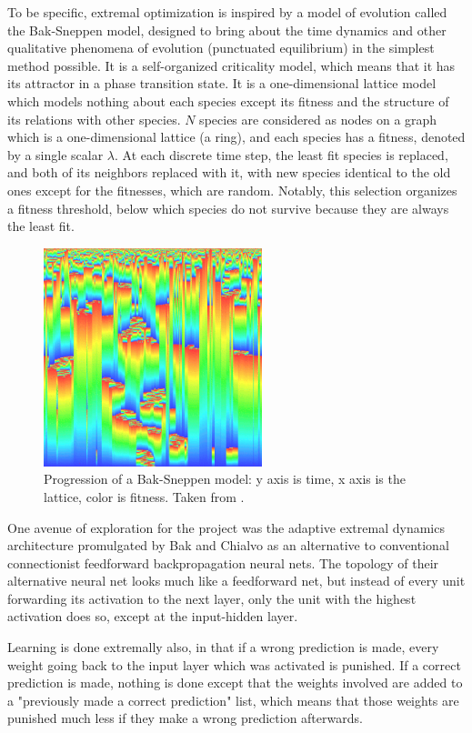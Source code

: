 \documentclass[12pt]{article}
\begin{document}
To be specific, extremal optimization is inspired by a model of evolution called the Bak-Sneppen model\cite{baksneppen}, designed to bring about the time dynamics and other qualitative phenomena of evolution (punctuated equilibrium)\cite{gould} in the simplest method possible. It is a self-organized criticality model, which means that it has its attractor in a phase transition state. It is a one-dimensional lattice model which models nothing about each species except its fitness and the structure of its relations with other species. $N$ species are considered as nodes on a graph which is a one-dimensional lattice (a ring), and each species has a fitness, denoted by a single scalar $\lambda$. At each discrete time step, the least fit species is replaced, and both of its neighbors replaced with it, with new species identical to the old ones except for the fitnesses, which are random. Notably, this selection organizes a fitness threshold, below which species do not survive because they are always the least fit.

\begin{figure}
  \includegraphics[width=2.5in]{bak_sneppen}
  \caption{Progression of a Bak-Sneppen model: y axis is time, x axis is the lattice, color is fitness. Taken from \cite{baksneppen}.}
\end{figure}

One avenue of exploration for the project was the adaptive extremal dynamics architecture promulgated by Bak and Chialvo\cite{bakchialvo} as an alternative to conventional connectionist feedforward backpropagation neural nets. The topology of their alternative neural net looks much like a feedforward net, but instead of every unit forwarding its activation to the next layer, only the unit with the highest activation does so, except at the input-hidden layer.

Learning is done extremally also, in that if a wrong prediction is made, every weight going back to the input layer which was activated is punished. If a correct prediction is made, nothing is done except that the weights involved are added to a "previously made a correct prediction" list, which means that those weights are punished much less if they make a wrong prediction afterwards.
\end{document}
